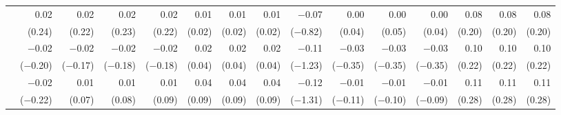\begin{tabularx}{1.45\textwidth}{lRRRRRRRRRRRRRR}
		 & \num{0.02}\phantom{***)} & \num{0.02}\phantom{***)} & \num{0.02}\phantom{***)} & \num{0.02}\phantom{***)} & \num{0.01}\phantom{***)} & \num{0.01}\phantom{***)} & \num{0.01}\phantom{***)} & \num{-0.07}\phantom{***)} & \num{0.00}\phantom{***)} & \num{0.00}\phantom{***)} & \num{0.00}\phantom{***)} & \num{0.08}\phantom{***)} & \num{0.08}\phantom{***)} & \num{0.08}\phantom{***)} \\
		 & (\num{0.24})\phantom{***} & (\num{0.22})\phantom{***} & (\num{0.23})\phantom{***} & (\num{0.22})\phantom{***} & (\num{0.02})\phantom{***} & (\num{0.02})\phantom{***} & (\num{0.02})\phantom{***} & (\num{-0.82})\phantom{***} & (\num{0.04})\phantom{***} & (\num{0.05})\phantom{***} & (\num{0.04})\phantom{***} & (\num{0.20})\phantom{***} & (\num{0.20})\phantom{***} & (\num{0.20})\phantom{***} \\ [\dspacing]
		 & \num{-0.02}\phantom{***)} & \num{-0.02}\phantom{***)} & \num{-0.02}\phantom{***)} & \num{-0.02}\phantom{***)} & \num{0.02}\phantom{***)} & \num{0.02}\phantom{***)} & \num{0.02}\phantom{***)} & \num{-0.11}\phantom{***)} & \num{-0.03}\phantom{***)} & \num{-0.03}\phantom{***)} & \num{-0.03}\phantom{***)} & \num{0.10}\phantom{***)} & \num{0.10}\phantom{***)} & \num{0.10}\phantom{***)} \\
		 & (\num{-0.20})\phantom{***} & (\num{-0.17})\phantom{***} & (\num{-0.18})\phantom{***} & (\num{-0.18})\phantom{***} & (\num{0.04})\phantom{***} & (\num{0.04})\phantom{***} & (\num{0.04})\phantom{***} & (\num{-1.23})\phantom{***} & (\num{-0.35})\phantom{***} & (\num{-0.35})\phantom{***} & (\num{-0.35})\phantom{***} & (\num{0.22})\phantom{***} & (\num{0.22})\phantom{***} & (\num{0.22})\phantom{***} \\ [\dspacing]
		 & \num{-0.02}\phantom{***)} & \num{0.01}\phantom{***)} & \num{0.01}\phantom{***)} & \num{0.01}\phantom{***)} & \num{0.04}\phantom{***)} & \num{0.04}\phantom{***)} & \num{0.04}\phantom{***)} & \num{-0.12}\phantom{***)} & \num{-0.01}\phantom{***)} & \num{-0.01}\phantom{***)} & \num{-0.01}\phantom{***)} & \num{0.11}\phantom{***)} & \num{0.11}\phantom{***)} & \num{0.11}\phantom{***)} \\
		 & (\num{-0.22})\phantom{***} & (\num{0.07})\phantom{***} & (\num{0.08})\phantom{***} & (\num{0.09})\phantom{***} & (\num{0.09})\phantom{***} & (\num{0.09})\phantom{***} & (\num{0.09})\phantom{***} & (\num{-1.31})\phantom{***} & (\num{-0.11})\phantom{***} & (\num{-0.10})\phantom{***} & (\num{-0.09})\phantom{***} & (\num{0.28})\phantom{***} & (\num{0.28})\phantom{***} & (\num{0.28})\phantom{***} \\ [\dspacing]

\end{tabularx}
